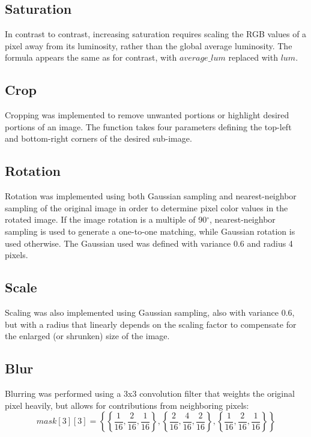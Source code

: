 \documentclass[10pt,twocolumn,twoside]{IEEEtran}
\begin{document}
\subsection{Saturation}
In contrast to contrast, increasing saturation requires scaling the RGB values of a pixel away from its luminosity, rather than the global average luminosity. The formula appears the same as for contrast, with $average\_lum$ replaced with $lum$.

\subsection{Crop}
Cropping was implemented to remove unwanted portions or highlight desired portions of an image. The function takes four parameters defining the top-left and bottom-right corners of the desired sub-image.

\subsection{Rotation}
Rotation was implemented using both Gaussian sampling and nearest-neighbor sampling of the original image in order to determine pixel color values in the rotated image. If the image rotation is a multiple of 90$^\circ$, nearest-neighbor sampling is used to generate a one-to-one matching, while Gaussian rotation is used otherwise. The Gaussian used was defined with variance 0.6 and radius 4 pixels. 

\subsection{Scale}
Scaling was also implemented using Gaussian sampling, also with variance 0.6, but with a radius that linearly depends on the scaling factor to compensate for the enlarged (or shrunken) size of the image.

\subsection{Blur}
Blurring was performed using a 3x3 convolution filter that weights the original pixel heavily, but allows for contributions from neighboring pixels:
{\small{
\begin{equation*}
mask[3][3] = \left\{ \left\{\frac{1}{16}, \frac{2}{16}, \frac{1}{16}\right\}, \left\{\frac{2}{16}, \frac{4}{16}, \frac{2}{16}\right\}, \left\{\frac{1}{16}, \frac{2}{16}, \frac{1}{16}\right\} \right\}
\end{equation*}
}}
\end{document}
